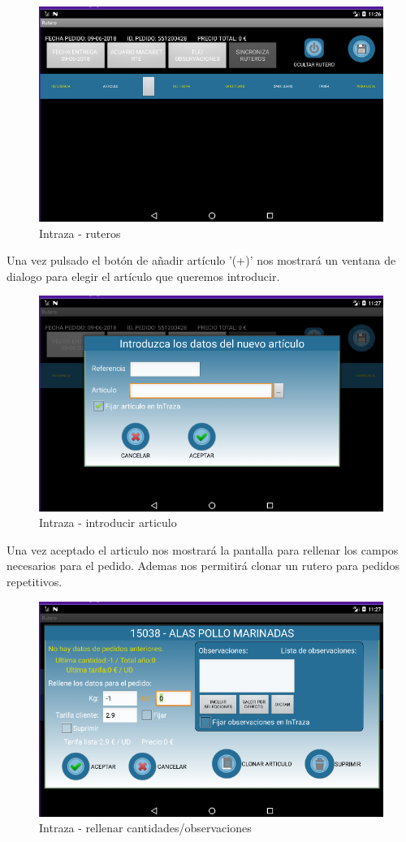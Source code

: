 \begin{figure}[H]
	\centering
	\includegraphics[width=0.65\linewidth]{figuras/manual/p2}
	\caption{Intraza - ruteros}
	\label{fig:Itzp3}
\end{figure}

\pagebreak

Una vez pulsado el botón de añadir artículo '(+)' nos mostrará un ventana de dialogo para elegir el artículo que queremos introducir. 

\begin{figure}[H]
	\centering
	\includegraphics[width=0.7\linewidth]{figuras/manual/p4}
	\caption{Intraza - introducir articulo}
	\label{fig:Itzp4}
\end{figure}

Una vez aceptado el articulo nos mostrará la pantalla para rellenar los campos necesarios para el pedido. Ademas nos permitirá clonar un rutero para pedidos repetitivos.

\begin{figure}[H]
	\centering
	\includegraphics[width=0.7\linewidth]{figuras/manual/p5}
	\caption{Intraza - rellenar cantidades/observaciones}
	\label{fig:Itzp5}
\end{figure}

